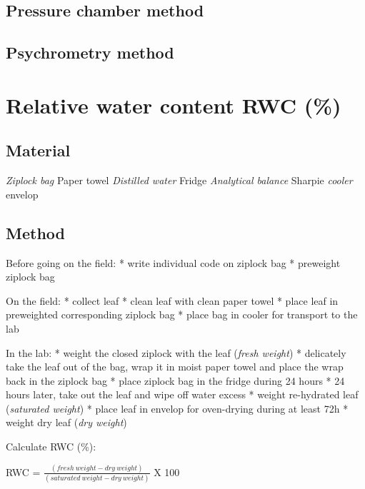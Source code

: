 \documentclass[
  12pt,
  american,
  a4paper,
  extrafontsizes,onecolumn,openright
  ]{memoir}
\begin{document}
\hypertarget{pressure-chamber-method}{%
\section{Pressure chamber method}\label{pressure-chamber-method}}

\hypertarget{psychrometry-method}{%
\section{Psychrometry method}\label{psychrometry-method}}

\hypertarget{relative-water-content-rwc}{%
\chapter{Relative water content RWC (\%)}\label{relative-water-content-rwc}}

\hypertarget{material}{%
\section{Material}\label{material}}

\emph{Ziplock bag
}Paper towel
\emph{Distilled water
}Fridge
\emph{Analytical balance
}Sharpie
\emph{cooler
}envelop

\hypertarget{method}{%
\section{Method}\label{method}}

Before going on the field:
* write individual code on ziplock bag
* preweight ziplock bag

On the field:
* collect leaf
* clean leaf with clean paper towel
* place leaf in preweighted corresponding ziplock bag
* place bag in cooler for transport to the lab

In the lab:
* weight the closed ziplock with the leaf (\emph{fresh weight})
* delicately take the leaf out of the bag, wrap it in moist paper towel and place the wrap back in the ziplock bag
* place ziplock bag in the fridge during 24 hours
* 24 hours later, take out the leaf and wipe off water excess
* weight re-hydrated leaf (\emph{saturated weight})
* place leaf in envelop for oven-drying during at least 72h
* weight dry leaf (\emph{dry weight})

Calculate RWC (\%):

RWC = \(\frac{(fresh\ weight-dry\ weight)}{(saturated\ weight-dry\ weight)}\) X 100
\end{document}
